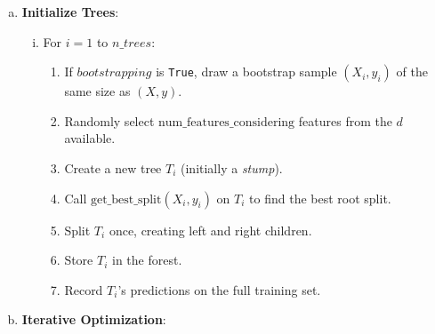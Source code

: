 \documentclass{article}
\begin{document}
\begin{enumerate}[(a)]
    \item \textbf{Initialize Trees}:

    \begin{enumerate}[(i)]
        \item For $i = 1$ to $n\_trees$:
        \begin{enumerate}
            \item If $bootstrapping$ is \texttt{True}, draw a bootstrap sample $(X_i, y_i)$ of the same size as $(X, y)$.
            \item Randomly select \(\text{num\_features\_considering}\) features from the $d$ available.
            \item Create a new tree $T_i$ (initially a \textit{stump}).
            \item Call \(\text{get\_best\_split}(X_i, y_i)\) on $T_i$ to find the best root split. 
            \item Split $T_i$ once, creating left and right children.
            \item Store $T_i$ in the forest.
            \item Record $T_i$'s predictions on the full training set.
        \end{enumerate}
    \end{enumerate}

    \item \textbf{Iterative Optimization}:


\end{enumerate}
\end{document}
